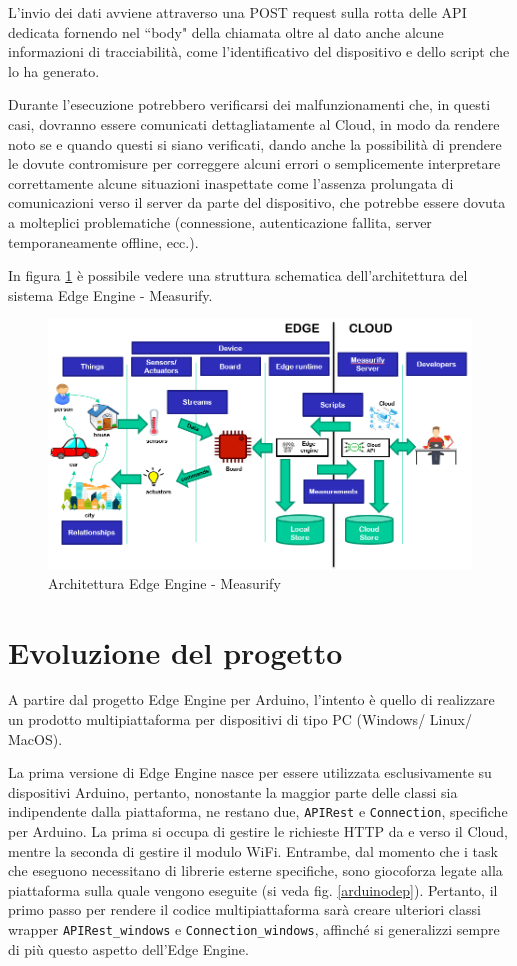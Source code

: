 L'invio dei dati avviene attraverso una POST request sulla rotta delle API dedicata fornendo nel “body" della chiamata oltre al dato anche alcune informazioni di tracciabilità, come l'identificativo del dispositivo e dello script che lo ha generato.

Durante l’esecuzione potrebbero verificarsi dei malfunzionamenti che, in questi casi, dovranno essere comunicati dettagliatamente al Cloud, in modo da rendere noto se e quando questi si siano verificati, dando anche la possibilità di prendere le dovute contromisure per correggere alcuni errori o semplicemente interpretare correttamente alcune situazioni inaspettate come l'assenza prolungata di comunicazioni verso il server da parte del dispositivo, che potrebbe essere dovuta a molteplici problematiche (connessione, autenticazione fallita, server temporaneamente offline, ecc.).

In figura \ref{edgecloud} è possibile vedere una struttura schematica dell'architettura del sistema Edge Engine - Measurify.

\begin{figure}[H]
	\centering
	\includegraphics[width=\linewidth]{pics/edgearch}
	\caption{Architettura Edge Engine - Measurify}
	\label{edgecloud}
\end{figure}

\section{Evoluzione del progetto}
A partire dal progetto Edge Engine per Arduino, l’intento è quello di realizzare un prodotto multipiattaforma per dispositivi di tipo PC (Windows/ Linux/ MacOS).

La prima versione di Edge Engine nasce per essere utilizzata esclusivamente su dispositivi Arduino, pertanto, nonostante la maggior parte delle classi sia indipendente dalla piattaforma, ne restano due, \texttt{APIRest} e \texttt{Connection}, specifiche per Arduino. La prima si occupa di gestire le richieste HTTP da e verso il Cloud, mentre la seconda di gestire il modulo WiFi. Entrambe, dal momento che i task che eseguono necessitano di librerie esterne specifiche, sono giocoforza legate alla piattaforma sulla quale vengono eseguite (si veda fig. \ref{arduinodep}). Pertanto, il primo passo per rendere il codice multipiattaforma sarà creare ulteriori classi wrapper \texttt{APIRest\_windows} e \texttt{Connection\_windows}, affinché si generalizzi sempre di più questo aspetto dell'Edge Engine.

